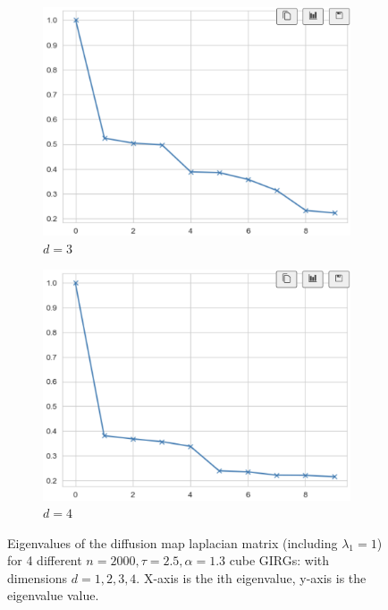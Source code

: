 \begin{figure}
  \begin{subfigure}{0.45\textwidth}
    \centering
    \includegraphics[width=\linewidth]{figures/diffmap_3d.png}
    \caption{$d=3$}
  \end{subfigure}
  \hfill
  \begin{subfigure}{0.45\textwidth}
    \centering
    \includegraphics[width=\linewidth]{figures/diffmap_4d.png}
    \caption{$d=4$}
    \label{fig:cube_diffmaps_d4}
  \end{subfigure}

  \caption{Eigenvalues of the diffusion map laplacian matrix (including $\lambda_1 = 1$) for 4 different $n=2000, \tau=2.5, \alpha=1.3$ cube GIRGs: with dimensions $d=1,2,3,4$. X-axis is the ith eigenvalue, y-axis is the eigenvalue value.}
  \label{fig:cube_diffmaps_d1to4_evals}
\end{figure}

